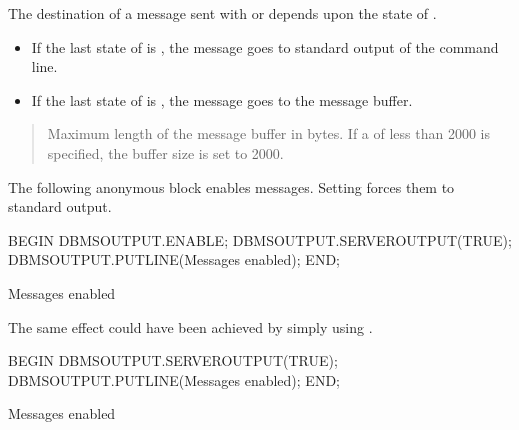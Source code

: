 \documentclass[letterpaper,10pt,english,openany,oneside]{sphinxmanual}
\begin{document}
The destination of a message sent with  or 
depends upon the state of .
\begin{itemize}
\item {} 
If the last state of  is , the message goes to
standard output of the command line.

\item {} 
If the last state of  is , the message goes to the
message buffer.
\begin{quote}

\end{quote}

\end{itemize}


\begin{quote}

Maximum length of the message buffer in bytes. If a  of
less than 2000 is specified, the buffer size is set to 2000.
\end{quote}


The following anonymous block enables messages. Setting
 forces them to standard output.

%
\begin{sphinxVerbatim}[commandchars=\\\{\}]
BEGIN
   DBMS\PYGZus{}OUTPUT.ENABLE;
   DBMS\PYGZus{}OUTPUT.SERVEROUTPUT(TRUE);
   DBMS\PYGZus{}OUTPUT.PUT\PYGZus{}LINE(\PYGZsq{}Messages enabled\PYGZsq{});
END;

Messages enabled
\end{sphinxVerbatim}

The same effect could have been achieved by simply using
.

%
\begin{sphinxVerbatim}[commandchars=\\\{\}]
BEGIN
   DBMS\PYGZus{}OUTPUT.SERVEROUTPUT(TRUE);
   DBMS\PYGZus{}OUTPUT.PUT\PYGZus{}LINE(\PYGZsq{}Messages enabled\PYGZsq{});
END;

Messages enabled
\end{sphinxVerbatim}
\end{document}
